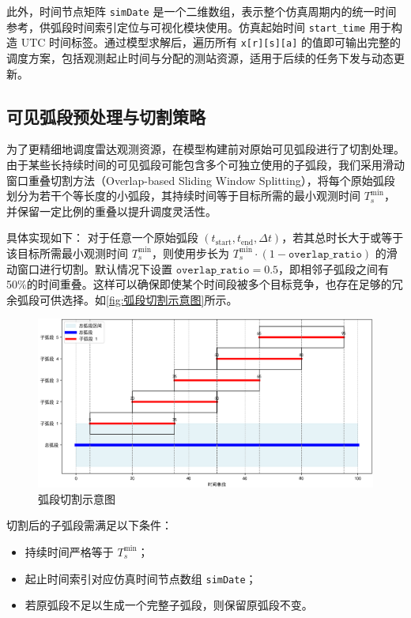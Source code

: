\documentclass[openany,12pt,UTF8]{ctexart}
\begin{document}
此外，时间节点矩阵 \texttt{simDate} 是一个二维数组，表示整个仿真周期内的统一时间参考，供弧段时间索引定位与可视化模块使用。仿真起始时间 \texttt{start\_time} 用于构造 UTC 时间标签。通过模型求解后，遍历所有 \texttt{x[r][s][a]} 的值即可输出完整的调度方案，包括观测起止时间与分配的测站资源，适用于后续的任务下发与动态更新。

\subsection{可见弧段预处理与切割策略}
为了更精细地调度雷达观测资源，在模型构建前对原始可见弧段进行了切割处理。由于某些长持续时间的可见弧段可能包含多个可独立使用的子弧段，我们采用滑动窗口重叠切割方法（Overlap-based Sliding Window Splitting），将每个原始弧段划分为若干个等长度的小弧段，其持续时间等于目标所需的最小观测时间 $T_s^{\min}$，并保留一定比例的重叠以提升调度灵活性。

具体实现如下：  
对于任意一个原始弧段 $(t_{\text{start}}, t_{\text{end}}, \Delta t)$，若其总时长大于或等于该目标所需最小观测时间 $T_s^{\min}$，则使用步长为 $T_s^{\min} \cdot (1 - \texttt{overlap\_ratio})$ 的滑动窗口进行切割。默认情况下设置 $\texttt{overlap\_ratio}=0.5$，即相邻子弧段之间有50\%的时间重叠。这样可以确保即使某个时间段被多个目标竞争，也存在足够的冗余弧段可供选择。如\autoref{fig:弧段切割示意图}所示。

\begin{figure}[h]
    \centering
    \includegraphics[width=\columnwidth]{figures/弧段切割示意图.png}
    \caption{弧段切割示意图}
    \label{fig:弧段切割示意图}
\end{figure}

切割后的子弧段需满足以下条件：  
\begin{itemize}
    \item 持续时间严格等于 $T_s^{\min}$；
    \item 起止时间索引对应仿真时间节点数组 \texttt{simDate}；
    \item 若原弧段不足以生成一个完整子弧段，则保留原弧段不变。
\end{itemize}
\end{document}
